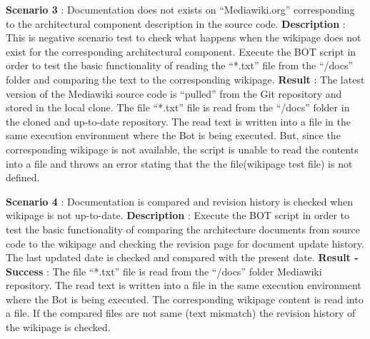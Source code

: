 \begin{mdframed}[leftmargin=10pt,rightmargin=10pt]
\textbf{Scenario 3} : Documentation does not exists on \enquote{Mediawiki.org} corresponding to the architectural component description in the source code.
\newline
\newline \textbf{Description} : This is negative scenario test to check what happens when the wikipage does not exist for the corresponding architectural component. Execute the BOT script in order to test the basic functionality of reading the \enquote{*.txt} file from the \enquote{/docs} folder and comparing the text to the corresponding wikipage. 
\newline 
\newline \textbf{Result} : The latest version of the Mediawiki source code is \enquote{pulled} from the Git repository and stored in the local clone. The file \enquote{*.txt} file is read from the \enquote{/docs} folder in the cloned and up-to-date repository. The read text is written into a file in the same execution environment where the Bot is being executed. But, since the corresponding wikipage is not available, the script is unable to read the contents into a file and throws an error stating that the the file(wikipage test file) is not defined.
\end{mdframed}
\begin{mdframed}[leftmargin=10pt,rightmargin=10pt]
\textbf{Scenario 4} : Documentation is compared and revision history is checked when wikipage is not up-to-date.
\newline
\newline \textbf{Description} : Execute the BOT script in order to test the basic functionality of comparing the architecture documents from source code to the wikipage and checking the revision page for document update history. The last updated date is checked and compared with the present date.
\newline 
\newline \textbf{Result - Success} : The file \enquote{*.txt} file is read from the \enquote{/docs} folder Mediawiki repository. The read text is written into a file in the same execution environment where the Bot is being executed. The corresponding wikipage content is read into a file. If the compared files are not same (text mismatch) the revision history of the wikipage is checked.
\end{mdframed}
